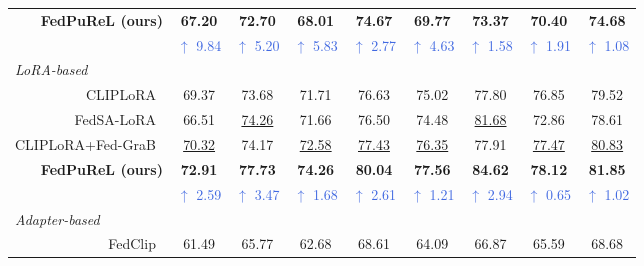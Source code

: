 \documentclass[10pt,twocolumn,letterpaper]{article}
\newcommand{\blueup}[1]{\textcolor{RoyalBlue}{$\uparrow$ #1}}
\begin{document}
\begin{table}[!t]
{{\begin{tabular}{r||cc|cc|cc|cc}
 
\cellcolor[HTML]{D7F6FF}\textbf{FedPuReL (ours)}
 & \cellcolor[HTML]{D7F6FF}\textbf{67.20} & \cellcolor[HTML]{D7F6FF}\textbf{72.70} & \cellcolor[HTML]{D7F6FF}\textbf{68.01} & \cellcolor[HTML]{D7F6FF}\textbf{74.67}
 & \cellcolor[HTML]{D7F6FF}\textbf{69.77} & \cellcolor[HTML]{D7F6FF}\textbf{73.37} & \cellcolor[HTML]{D7F6FF}\textbf{70.40} & \cellcolor[HTML]{D7F6FF}\textbf{74.68} \\
 
\textcolor{gray!60}&
\blueup{9.84} & \blueup{5.20} &
\blueup{5.83} & \blueup{2.77} &
\blueup{4.63} & \blueup{1.58} &
\blueup{1.91} & \blueup{1.08} \\
\hline
\multicolumn{9}{l}{\textcolor{gray!60}{\textit{LoRA-based}}} \\
\cellcolor{gray!10}CLIPLoRA~\cite{cliplora}
 & \cellcolor{gray!10}69.37 & \cellcolor{gray!10}73.68 & \cellcolor{gray!10}71.71 & \cellcolor{gray!10}76.63
 & \cellcolor{gray!10}75.02 & \cellcolor{gray!10}77.80 & \cellcolor{gray!10}76.85 & \cellcolor{gray!10}79.52 \\

FedSA-LoRA~\cite{wang2024fedsalora}
 & 66.51 & \underline{74.26} & 71.66 & 76.50
 & 74.48 & \underline{81.68} & 72.86 & 78.61 \\
 
\cellcolor{gray!10} CLIPLoRA+Fed-GraB~\cite{Fed-Grab}
 & \cellcolor{gray!10}\underline{70.32} & \cellcolor{gray!10}74.17 & \cellcolor{gray!10}\underline{72.58} & \cellcolor{gray!10}\underline{77.43}
 & \cellcolor{gray!10}\underline{76.35} & \cellcolor{gray!10}77.91 & \cellcolor{gray!10}\underline{77.47} & \cellcolor{gray!10}\underline{80.83} \\


\cellcolor[HTML]{D7F6FF}\textbf{FedPuReL (ours)}
 & \cellcolor[HTML]{D7F6FF}\textbf{72.91} & \cellcolor[HTML]{D7F6FF}\textbf{77.73} & \cellcolor[HTML]{D7F6FF}\textbf{74.26} & \cellcolor[HTML]{D7F6FF}\textbf{80.04}
 & \cellcolor[HTML]{D7F6FF}\textbf{77.56} & \cellcolor[HTML]{D7F6FF}\textbf{84.62} & \cellcolor[HTML]{D7F6FF}\textbf{78.12} & \cellcolor[HTML]{D7F6FF}\textbf{81.85} \\
\textcolor{gray!60} &
\blueup{2.59} & \blueup{3.47} &
\blueup{1.68} & \blueup{2.61} &
\blueup{1.21} & \blueup{2.94} &
\blueup{0.65} & \blueup{1.02} \\

\hline
\multicolumn{9}{l}{\textcolor{gray!60}{\textit{Adapter-based}}} \\
\cellcolor{gray!10}FedClip~\cite{lu2023fedclip}
& \cellcolor{gray!10}61.49 & \cellcolor{gray!10}65.77 & \cellcolor{gray!10}62.68 & \cellcolor{gray!10}68.61
 & \cellcolor{gray!10}64.09 & \cellcolor{gray!10}66.87 & \cellcolor{gray!10}65.59 & \cellcolor{gray!10}68.68 \\


\end{tabular}}}
\end{table}
\end{document}
